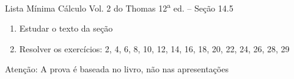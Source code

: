 \begin{frame}{Lista Mínima}
  Cálculo Vol. 2 do Thomas 12\textsuperscript{a} ed. -- Seção 14.5
  \begin{enumerate}
    \item Estudar o texto da seção
    \item Resolver os exercícios: 2, 4, 6, 8, 10, 12, 14, 16, 18, 20, 22, 24, 26, 28, 29
  \end{enumerate}

  \vfill
  Atenção: A prova é baseada no livro, não nas apresentações
\end{frame}


